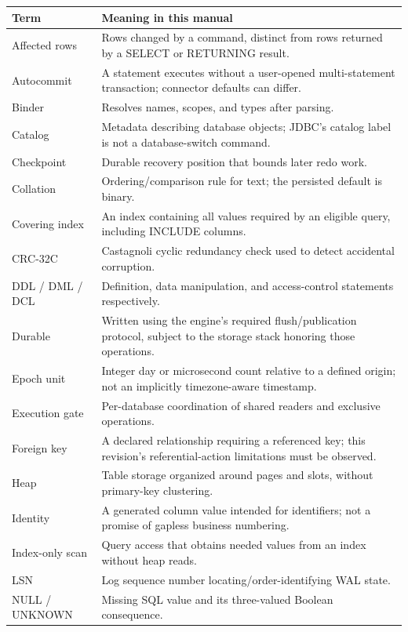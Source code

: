 \begin{longtable}{p{.25\linewidth}p{.66\linewidth}}
\toprule Term & Meaning in this manual \\\midrule
Affected rows & Rows changed by a command, distinct from rows returned by a SELECT or RETURNING result. \\
Autocommit & A statement executes without a user-opened multi-statement transaction; connector defaults can differ. \\
Binder & Resolves names, scopes, and types after parsing. \\
Catalog & Metadata describing database objects; JDBC's catalog label is not a database-switch command. \\
Checkpoint & Durable recovery position that bounds later redo work. \\
Collation & Ordering/comparison rule for text; the persisted default is binary. \\
Covering index & An index containing all values required by an eligible query, including INCLUDE columns. \\
CRC-32C & Castagnoli cyclic redundancy check used to detect accidental corruption. \\
DDL / DML / DCL & Definition, data manipulation, and access-control statements respectively. \\
Durable & Written using the engine's required flush/publication protocol, subject to the storage stack honoring those operations. \\
Epoch unit & Integer day or microsecond count relative to a defined origin; not an implicitly timezone-aware timestamp. \\
Execution gate & Per-database coordination of shared readers and exclusive operations. \\
Foreign key & A declared relationship requiring a referenced key; this revision's referential-action limitations must be observed. \\
Heap & Table storage organized around pages and slots, without primary-key clustering. \\
Identity & A generated column value intended for identifiers; not a promise of gapless business numbering. \\
Index-only scan & Query access that obtains needed values from an index without heap reads. \\
LSN & Log sequence number locating/order-identifying WAL state. \\
NULL / UNKNOWN & Missing SQL value and its three-valued Boolean consequence. \\

\end{longtable}
